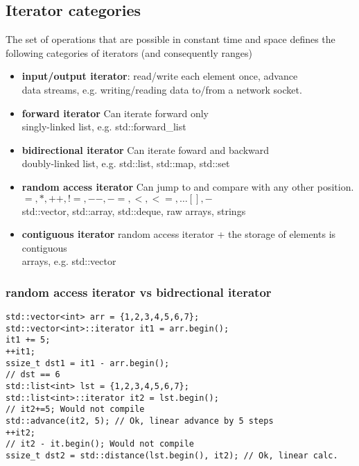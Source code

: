 \documentclass{report}
\begin{document}
\subsection{Iterator categories}
The set of operations that are possible in constant time and space defines the following categories of iterators (and consequently ranges)
\begin{itemize}
  \item \textbf{input/output iterator}: read/write each element once, advance \\ data streams, e.g. writing/reading data to/from a network socket.
  \item \textbf{forward iterator}  Can iterate forward only  \\ singly-linked list, e.g. std::forward\_list 
  \item \textbf{bidirectional iterator} Can iterate foward and backward\\ doubly-linked list, e.g. std::list, std::map, std::set
  \item \textbf{random access iterator} Can jump to and compare with any other position. \\ $=, *, ++, !=, --, -=, <,<=, \ldots [], -$ \\ std::vector, std::array, std::deque, raw arrays, strings
  \item \textbf{contiguous iterator} random access iterator + the storage of elements is contiguous \\ arrays, e.g. std::vector
\end{itemize}
\subsubsection*{random access iterator vs bidrectional iterator}
\begin{verbatim}
std::vector<int> arr = {1,2,3,4,5,6,7};
std::vector<int>::iterator it1 = arr.begin();
it1 += 5;
++it1;
ssize_t dst1 = it1 - arr.begin();
// dst == 6
std::list<int> lst = {1,2,3,4,5,6,7};
std::list<int>::iterator it2 = lst.begin();
// it2+=5; Would not compile
std::advance(it2, 5); // Ok, linear advance by 5 steps
++it2;
// it2 - it.begin(); Would not compile
ssize_t dst2 = std::distance(lst.begin(), it2); // Ok, linear calc.
\end{verbatim}
\end{document}
